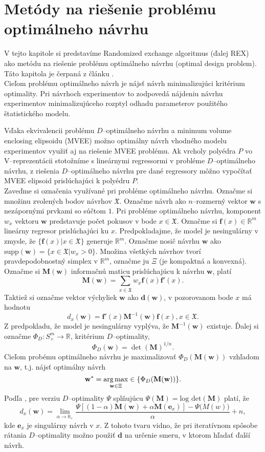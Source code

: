 \chapter{Metódy na riešenie problému optimálneho návrhu}

V tejto kapitole si predstavíme Randomized exchange algoritmus \cite{rex_harman} (ďalej REX) ako metódu na riešenie problému optimálneho návrhu (optimal design problem). Táto kapitola je čerpaná z článku \cite{rex_harman}. \\

Cieľom problému optimálneho návrh je nájsť návrh minimalizujúci kritérium optimality. Pri návrhoch experimentov to zodpovedá nájdeniu návrhu experimentov minimalizujúceho rozptyl odhadu parameterov použitého štatistického modelu.

Vďaka ekvivalencii problému $D$--optimálneho návrhu a minimum volume enclosing elipsoidu (MVEE) možno optimálny návrh vhodného modelu experimentov využiť aj na riešenie MVEE problému. Ak vrcholy polyédra $P$ vo V--reprezentácii stotožníme s lineárnymi regressormi v probléme $D$--optimálneho návrhu, z riešenia $D$--optimálneho návrhu pre dané regressory môžno vypočítať MVEE elipsoid prislúchajúci k polyédru $P$.\\

Zaveďme si označenia využívané pri probléme optimálneho návrhu. Označme si množinu zvolených bodov návrhov $\mathfrak X$.
Označme návrh ako $n$--rozmerný vektor $\mathbf{w}$ s nezápornými prvkami so súčtom $1$. Pri probléme optimálneho návrhu, komponent $w_x$ vektoru $\mathbf{w}$ predstavuje počet pokusov v bode $x \in \mathfrak X$.
Označme si $\mathbf{f}(x)\in \mathbb{R}^m$ lineárny regresor prislúchajúci ku $x$. Predpokladajme, že model je nesingulárny v zmysle, že $\{ \mathbf f(x)|x \in \mathfrak X \}$ generuje $\mathbb R^m$.
Označme nosič návrhu $\mathbf{w}$ ako $\text{supp}(\mathbf{w})=\{x \in \mathfrak{X}| w_x>0\}$. 
Množina všetkých návrhov tvorí pravdepodobnostný simplex v $\mathbb{R}^m$, označme ju $\Xi$ (je kompaktná a konvexná).
Označme si $\mathbf{M(w)}$ informačnú maticu prislúchajúcu k návrhu $\mathbf w$, platí $$\mathbf{M(w)}=\sum_{x\in \mathfrak X}w_x \mathbf{f}(x)\mathbf{f'}(x).$$
Taktiež si označme vektor výchyliek $\mathbf w$ ako $\mathbf {d(w)}$, v pozorovanom bode $x$ má hodnotu $$d_x(\mathbf w)=\mathbf {f'}(x)\mathbf M^{-1}(\mathbf w)\mathbf f(x), x \in \mathfrak X.$$ Z predpokladu, že model je nesingulárny vyplýva, že $\mathbf M^{-1}(\mathbf w)$ existuje.
Ďalej si označme $\Phi_D: S^m_+ \rightarrow \mathbb{R}$, kritérium $D$--optimality, $$\Phi_D(\mathbf{w})=\det(\mathbf{M})^{1/n}.$$
Cieľom probému optimálneho návrhu je maximalizovať $\Phi_D(\mathbf{M(w)})$ vzhľadom na $\mathbf w$, t.j. nájsť optimálny návrh $$\mathbf{w^*} = \operatorname*{arg\,max}_{\mathbf{w} \in \Xi} \in \{\Phi_D(\mathbf{M(w)})\}.$$ Podľa \cite{rex_harman}, pre verziu $D$--optimality $\Psi$ splňujúcu $\Psi(\mathbf M)= \text{log det}(\mathbf M)$ platí, že $$d_x(\mathbf w)= \lim_{\alpha \rightarrow 0_+} \frac{\Psi[(1-\alpha)\mathbf{M(w)}+\alpha\mathbf M(\mathbf e_x)]-\Psi\mathbf(M(w))}{\alpha}+n,$$ kde $\mathbf e_x$ je singulárny návrh v $x$. Z tohoto tvaru vidno, že pri iteratívnom spôsobe rátania $D$--optimality možno použiť $\mathbf d$ na určenie smeru, v ktorom hľadať ďalší návrh.

